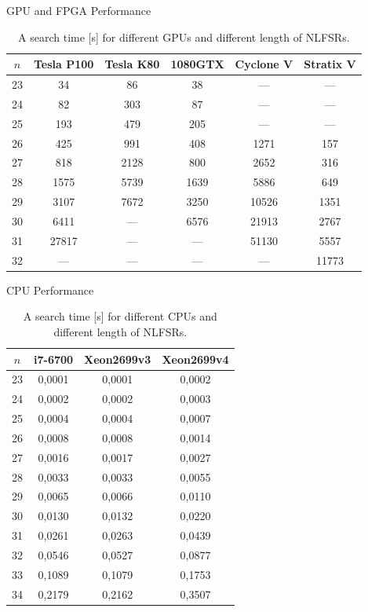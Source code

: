 \documentclass[10pt, compress]{beamer}
\begin{document}
\begin{frame}{GPU and FPGA Performance}
\begin{table}[]
    \centering
\begin{tabular}{ ||c||c|c|c||c|c|| } 
\hline
$n$ &  Tesla P100 & Tesla K80 & 1080GTX & Cyclone V & Stratix V\\
\hline
\hline
23 & 34    & 86    & 38   & ---   & ---   \\ 
24 & 82    & 303   & 87   & ---   & ---   \\ 
25 & 193   & 479   & 205  & ---   & ---   \\ 
26 & 425   & 991   & 408  & 1271  & 157   \\ 
27 & 818   & 2128  & 800  & 2652  & 316   \\ 
28 & 1575  & 5739  & 1639 & 5886  & 649   \\ 
29 & 3107  & 7672  & 3250 & 10526 & 1351  \\
30 & 6411  & ---   & 6576 & 21913 & 2767  \\
31 & 27817 & ---   & ---  & 51130 & 5557  \\
32 & ---   & ---   & ---  & ---   & 11773 \\
\hline
\end{tabular}    
\caption{A search time [s] for different GPUs and different length of NLFSRs.}
\label{tab:my_label}
\end{table}
\end{frame}

\begin{frame}{CPU Performance}
\begin{table}[]
    \centering
\begin{tabular}{ ||c||c|c|c|| } 
\hline
$n$ & i7-6700  & Xeon2699v3 & Xeon2699v4 \\
\hline
23 & 0,0001 & 0,0001 & 0,0002 \\ 
24 & 0,0002 & 0,0002 & 0,0003 \\ 
25 & 0,0004 & 0,0004 & 0,0007 \\ 
26 & 0,0008 & 0,0008 & 0,0014 \\ 
27 & 0,0016 & 0,0017 & 0,0027 \\ 
28 & 0,0033 & 0,0033 & 0,0055 \\ 
29 & 0,0065 & 0,0066 & 0,0110 \\
30 & 0,0130 & 0,0132 & 0,0220 \\
31 & 0,0261 & 0,0263 & 0,0439 \\
32 & 0,0546 & 0,0527 & 0,0877 \\
33 & 0,1089 & 0,1079 & 0,1753 \\
34 & 0,2179 & 0,2162 & 0,3507 \\
\hline
\end{tabular}    
\caption{A search time [s] for different CPUs and different length of NLFSRs.}
\label{tab:my_label}
\end{table}
\end{frame}
\end{document}
